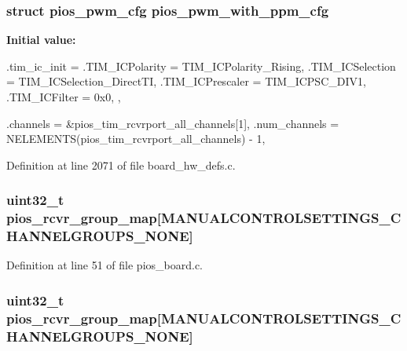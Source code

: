 \hypertarget{group___flying_f3_ga6a7a8338c617f18384f3b3c5678f5505}{
\subsubsection[{pios\-\_\-pwm\-\_\-with\-\_\-ppm\-\_\-cfg}]{\setlength{\rightskip}{0pt plus 5cm}struct {\bf pios\-\_\-pwm\-\_\-cfg} {\bf pios\-\_\-pwm\-\_\-with\-\_\-ppm\-\_\-cfg}}}\label{group___flying_f3_ga6a7a8338c617f18384f3b3c5678f5505}
{\bfseries \-Initial value\-:}
\begin{DoxyCode}
 {
        .tim_ic_init = {
                .TIM_ICPolarity = TIM_ICPolarity_Rising,
                .TIM_ICSelection = TIM_ICSelection_DirectTI,
                .TIM_ICPrescaler = TIM_ICPSC_DIV1,
                .TIM_ICFilter = 0x0,
        },
        
        .channels = &pios_tim_rcvrport_all_channels[1],
        .num_channels = NELEMENTS(pios_tim_rcvrport_all_channels) - 1,
}
\end{DoxyCode}


\-Definition at line 2071 of file board\-\_\-hw\-\_\-defs.\-c.

\hypertarget{group___flying_f3_ga6c6cfc16eb738e47c123298e062297e2}{
\subsubsection[{pios\-\_\-rcvr\-\_\-group\-\_\-map}]{\setlength{\rightskip}{0pt plus 5cm}uint32\-\_\-t {\bf pios\-\_\-rcvr\-\_\-group\-\_\-map}\mbox{[}{\bf \-M\-A\-N\-U\-A\-L\-C\-O\-N\-T\-R\-O\-L\-S\-E\-T\-T\-I\-N\-G\-S\-\_\-\-C\-H\-A\-N\-N\-E\-L\-G\-R\-O\-U\-P\-S\-\_\-\-N\-O\-N\-E}\mbox{]}}}\label{group___flying_f3_ga6c6cfc16eb738e47c123298e062297e2}


\-Definition at line 51 of file pios\-\_\-board.\-c.

\hypertarget{group___flying_f3_ga6c6cfc16eb738e47c123298e062297e2}{
\subsubsection[{pios\-\_\-rcvr\-\_\-group\-\_\-map}]{\setlength{\rightskip}{0pt plus 5cm}uint32\-\_\-t {\bf pios\-\_\-rcvr\-\_\-group\-\_\-map}\mbox{[}{\bf \-M\-A\-N\-U\-A\-L\-C\-O\-N\-T\-R\-O\-L\-S\-E\-T\-T\-I\-N\-G\-S\-\_\-\-C\-H\-A\-N\-N\-E\-L\-G\-R\-O\-U\-P\-S\-\_\-\-N\-O\-N\-E}\mbox{]}}}\label{group___flying_f3_ga6c6cfc16eb738e47c123298e062297e2}


